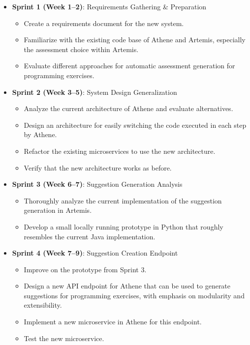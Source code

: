 \begin{itemize}
    \item \textbf{Sprint 1 (Week 1--2)}: Requirements Gathering \& Preparation
    \begin{itemize}
        \item Create a requirements document for the new system.
        \item Familiarize with the existing code base of Athene and Artemis, especially the assessment choice within Artemis.
        \item Evaluate different approaches for automatic assessment generation for programming exercises.
    \end{itemize}
    \item \textbf{Sprint 2 (Week 3--5)}: System Design Generalization
    \begin{itemize}
        \item Analyze the current architecture of Athene and evaluate alternatives.
        \item Design an architecture for easily switching the code executed in each step by Athene.
        \item Refactor the existing microservices to use the new architecture.
        \item Verify that the new architecture works as before.
    \end{itemize}
    \item \textbf{Sprint 3 (Week 6--7)}: Suggestion Generation Analysis
    \begin{itemize}
        \item Thoroughly analyze the current implementation of the suggestion generation in Artemis.
        \item Develop a small locally running prototype in Python that roughly resembles the current Java implementation.
    \end{itemize}
    \item \textbf{Sprint 4 (Week 7--9)}: Suggestion Creation Endpoint
    \begin{itemize}
        \item Improve on the prototype from Sprint 3.
        \item Design a new API endpoint for Athene that can be used to generate suggestions for programming exercises, with emphasis on modularity and extensibility.
        \item Implement a new microservice in Athene for this endpoint.
        \item Test the new microservice.

\end{itemize}
\end{itemize}
